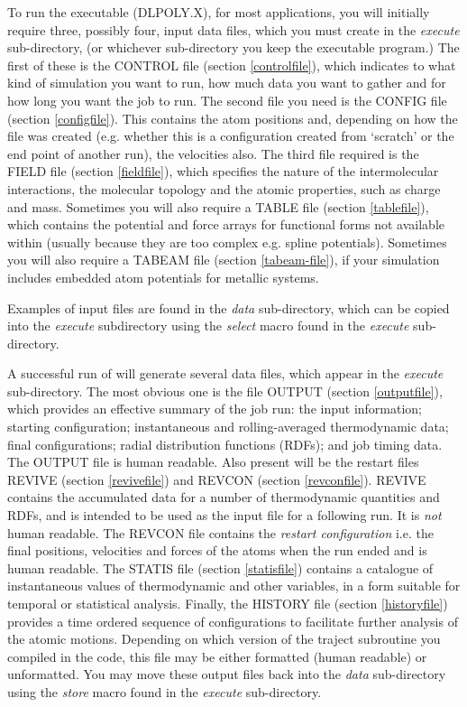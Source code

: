 To run the \D{} executable (DLPOLY.X), for most applications,
you will initially require three,
possibly four, input data files, which you must create in the {\em
execute} sub-directory, (or whichever sub-directory you keep the
executable program.) The first of these is the CONTROL file (section
\ref{controlfile}), which indicates to \D{} what kind of simulation you
want to run, how much data you want to gather and for how long you
want the job to run. The second file you need is the CONFIG file
(section \ref{configfile}). This contains the atom positions and,
depending on how the file was created (e.g. whether this is a
configuration created from `scratch' or the end point of another run),
the velocities also. The third file required is the FIELD file
(section \ref{fieldfile}), which specifies the nature of the
intermolecular interactions, the molecular topology and the atomic
properties, such as charge and mass.  Sometimes you will also require
a TABLE file (section \ref{tablefile}), which contains the
potential and force arrays for functional forms not available within
\D{} (usually because they are too complex e.g. spline
potentials). Sometimes you will also require a TABEAM file 
(section \ref{tabeam-file}), if your simulation includes embedded 
atom potentials for metallic systems.

Examples of input files are found in the {\em data} sub-directory,
which can be copied into the {\em execute} subdirectory using the {\sl
select} macro found in the {\em execute} sub-directory.

A successful run of \D{} will generate several data files, which appear
in the {\em execute} sub-directory. The most obvious one is the file
OUTPUT (section \ref{outputfile}), which provides an effective summary
of the job run: the input information; starting configuration;
instantaneous and rolling-averaged thermodynamic data; final
configurations; radial distribution functions (RDFs); and job timing
data. The OUTPUT file is human readable.  Also present will be the
restart files REVIVE (section \ref{revivefile}) and REVCON (section
\ref{revconfile}).  REVIVE contains the accumulated data for a number
of thermodynamic quantities and RDFs, and is intended to be used as
the input file for a following run. It is {\em not} human readable.
The REVCON file contains the {\em restart configuration} i.e. the
final positions, velocities and forces of the atoms when the run ended
and is human readable.  The STATIS file (section \ref{statisfile})
contains a catalogue of instantaneous values of thermodynamic and
other variables, in a form suitable for temporal or statistical
analysis.  Finally, the HISTORY file (section \ref{historyfile})
provides a time ordered sequence of configurations to facilitate
further analysis of the atomic motions.  Depending on which version of
the {\sc traject} subroutine you compiled in the code, this file may
be either formatted (human readable) or unformatted.  You may move
these output files back into the {\em data} sub-directory using the {\sl
store} macro found in the {\em execute} sub-directory.

